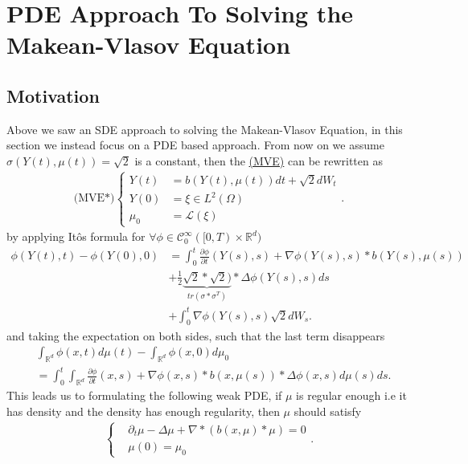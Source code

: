 \chapter{PDE Approach To Solving the Makean-Vlasov Equation}
\section{Motivation}
Above we saw an SDE approach to solving the Makean-Vlasov Equation, in this section we instead focus on a PDE based approach.
From now on we assume $\sigma(Y(t),\mu(t)) = \sqrt{2} $ is a constant, then the \hyperref[MVE]{(MVE)} can be rewritten as
 \begin{align*}
   \text{(MVE*)}\begin{cases}
    Y(t) &= b(Y(t),\mu(t)) dt + \sqrt{2} dW_t\\
    Y(0) &= \xi \in  L^{2}(\Omega ) \\
    \mu_0 &= \mathcal{L}(\xi)
   \end{cases}
 .\end{align*}
 by applying It\^os formula for $\forall \phi  \in  \mathcal{C}_0^{\infty}([0,T)\times \mathbb{R}^{d} ) $
\begin{align*}
  \phi(Y(t),t) - \phi(Y(0),0) &= \int_0^{t} \frac{\partial \phi }{\partial t}(Y(s),s) + \nabla \phi(Y(s),s)*b(Y(s),\mu(s))  \\
                              &+ \frac{1}{2} \underbrace{\sqrt{2}*\sqrt{2})}_{tr(\sigma *\sigma ^{T} )}* \Delta \phi(Y(s),s) ds \\
                              &+ \int_0^{t} \nabla \phi(Y(s),s)  \sqrt{2} dW_s 
.\end{align*}
and taking the expectation  on both sides, such that the last term disappears 
\begin{align*}
  &\int_{\mathbb{R}^{d} } \phi(x,t) d\mu(t) - \int_{\mathbb{R}^{d} } \phi(x,0) d\mu_0 \\
  &= \int_0^{t} \int_{\mathbb{R}^{d} } \frac{\partial \phi }{\partial t}(x,s) + \nabla \phi(x,s)*b(x,\mu(s))* \Delta \phi(x,s)  d\mu(s) ds
.\end{align*}
This leads us to formulating the following weak PDE, if $\mu$ is regular enough i.e it has density and the density has enough regularity, then $\mu $ should satisfy 
\begin{align*}
  \begin{cases}
    &\partial_t \mu  - \Delta \mu  + \nabla * (b(x,\mu) * \mu )  =0\\
    &\mu(0) = \mu_0
  \end{cases}
.\end{align*}
